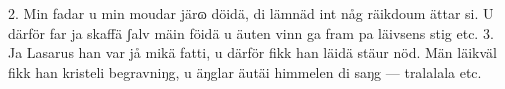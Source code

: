 2.  Min fadar u min moudar järɷ döidä,
    di lämnäd int någ räikdoum ättar si.
    U därför far ja skaffä ʃalv mäin föidä
    u äuten vinn ga fram pa läivsens stig etc.
3.  Ja Lasarus han var jå mikä fatti,
    u därför fikk han läidä stäur nöd.
    Män läikväl fikk han kristeli begravniŋg,
    u äŋglar äutäi himmelen di saŋg — tralalala etc.
